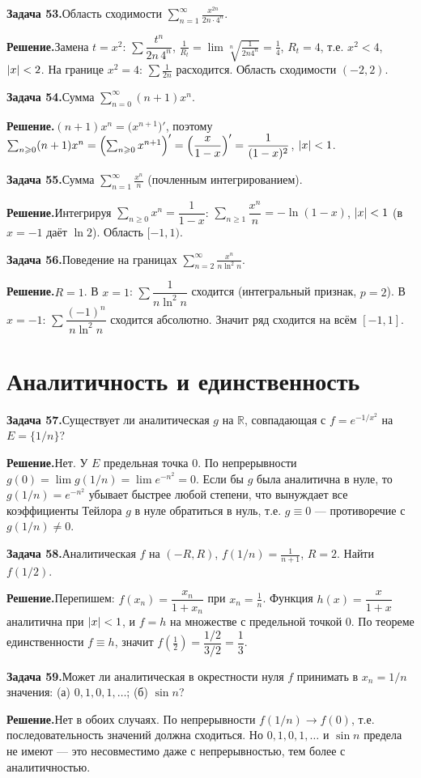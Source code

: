 \documentclass[10pt,a4paper]{article}
\newcommand{\R}{\mathbb{R}}
\renewcommand{\ge}{\geqslant}
\DeclarePairedDelimiter{\abs}{\lvert}{\rvert}
\theoremstyle{definition}
\theoremstyle{plain}
\newcommand{\writespace}{\vspace{7.5mm}}
\newcommand{\task}[2]{%
  \par\writespace\noindent
  \textbf{\textcolor{accent}{Задача #1.}}\enspace #2\par\smallskip}
\newcommand{\sol}{\par\noindent\textbf{Решение.}\enspace}
\begin{document}
\task{53}{Область сходимости $\displaystyle\sum_{n=1}^\infty\frac{x^{2n}}{2n\cdot4^n}$.}
\sol Замена $t=x^2$: $\sum\dfrac{t^n}{2n\,4^n}$, $\tfrac1{R_t}=\lim\sqrt[n]{\tfrac1{2n4^n}}=\tfrac14$,
$R_t=4$, т.е. $x^2<4$, $\abs x<2$. На границе $x^2=4$: $\sum\tfrac1{2n}$ расходится. Область
сходимости $(-2,2)$.

\task{54}{Сумма $\displaystyle\sum_{n=0}^\infty(n+1)x^n$.}
\sol $(n+1)x^n=\bigl(x^{n+1}\bigr)'$, поэтому
$\sum_{n\ge0}(n+1)x^n=\Bigl(\sum_{n\ge0}x^{n+1}\Bigr)'=\Bigl(\dfrac{x}{1-x}\Bigr)'=\dfrac1{(1-x)^2}$,
$\abs x<1$.

\task{55}{Сумма $\displaystyle\sum_{n=1}^\infty\frac{x^n}{n}$ (почленным интегрированием).}
\sol Интегрируя $\sum_{n\ge0}x^n=\dfrac1{1-x}$: $\sum_{n\ge1}\dfrac{x^n}{n}=-\ln(1-x)$, $\abs x<1$
(в $x=-1$ даёт $\ln2$). Область $[-1,1)$.

\task{56}{Поведение на границах $\displaystyle\sum_{n=2}^\infty\frac{x^n}{n\ln^2 n}$.}
\sol $R=1$. В $x=1$: $\sum\dfrac1{n\ln^2n}$ сходится (интегральный признак, $p=2$). В $x=-1$:
$\sum\dfrac{(-1)^n}{n\ln^2n}$ сходится абсолютно. Значит ряд сходится на всём $[-1,1]$.

\section{Аналитичность и единственность}

\task{57}{Существует ли аналитическая $g$ на $\R$, совпадающая с $f=e^{-1/x^2}$ на $E=\{1/n\}$?}
\sol Нет. У $E$ предельная точка $0$. По непрерывности $g(0)=\lim g(1/n)=\lim e^{-n^2}=0$. Если бы
$g$ была аналитична в нуле, то $g(1/n)=e^{-n^2}$ убывает быстрее любой степени, что вынуждает все
коэффициенты Тейлора $g$ в нуле обратиться в нуль, т.е. $g\equiv0$ — противоречие с $g(1/n)\ne0$.

\task{58}{Аналитическая $f$ на $(-R,R)$, $f(1/n)=\tfrac1{n+1}$, $R=2$. Найти $f(1/2)$.}
\sol Перепишем: $f(x_n)=\dfrac{x_n}{1+x_n}$ при $x_n=\tfrac1n$. Функция $h(x)=\dfrac{x}{1+x}$
аналитична при $\abs x<1$, и $f=h$ на множестве с предельной точкой $0$. По теореме единственности
$f\equiv h$, значит $f(\tfrac12)=\dfrac{1/2}{3/2}=\dfrac13$.

\task{59}{Может ли аналитическая в окрестности нуля $f$ принимать в $x_n=1/n$ значения: (а) $0,1,0,1,\dots$; (б) $\sin n$?}
\sol Нет в обоих случаях. По непрерывности $f(1/n)\to f(0)$, т.е. последовательность значений должна
сходиться. Но $0,1,0,1,\dots$ и $\sin n$ предела не имеют — это несовместимо даже с непрерывностью,
тем более с аналитичностью.
\end{document}
